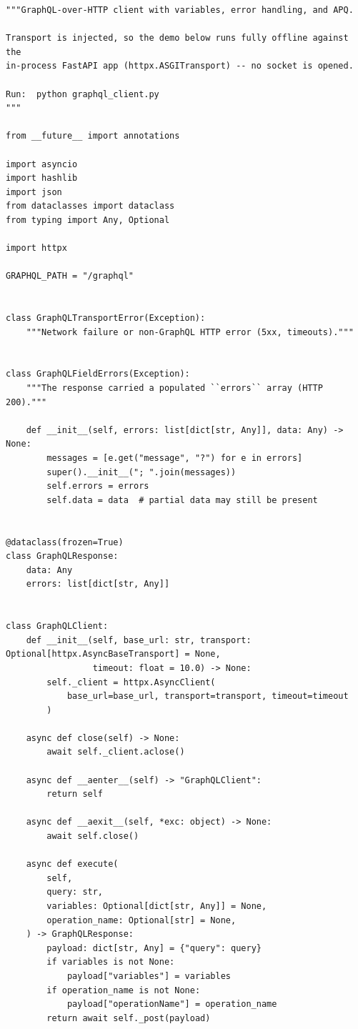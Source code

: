 \begin{verbatim}
"""GraphQL-over-HTTP client with variables, error handling, and APQ.

Transport is injected, so the demo below runs fully offline against the
in-process FastAPI app (httpx.ASGITransport) -- no socket is opened.

Run:  python graphql_client.py
"""

from __future__ import annotations

import asyncio
import hashlib
import json
from dataclasses import dataclass
from typing import Any, Optional

import httpx

GRAPHQL_PATH = "/graphql"


class GraphQLTransportError(Exception):
    """Network failure or non-GraphQL HTTP error (5xx, timeouts)."""


class GraphQLFieldErrors(Exception):
    """The response carried a populated ``errors`` array (HTTP 200)."""

    def __init__(self, errors: list[dict[str, Any]], data: Any) -> None:
        messages = [e.get("message", "?") for e in errors]
        super().__init__("; ".join(messages))
        self.errors = errors
        self.data = data  # partial data may still be present


@dataclass(frozen=True)
class GraphQLResponse:
    data: Any
    errors: list[dict[str, Any]]


class GraphQLClient:
    def __init__(self, base_url: str, transport: Optional[httpx.AsyncBaseTransport] = None,
                 timeout: float = 10.0) -> None:
        self._client = httpx.AsyncClient(
            base_url=base_url, transport=transport, timeout=timeout
        )

    async def close(self) -> None:
        await self._client.aclose()

    async def __aenter__(self) -> "GraphQLClient":
        return self

    async def __aexit__(self, *exc: object) -> None:
        await self.close()

    async def execute(
        self,
        query: str,
        variables: Optional[dict[str, Any]] = None,
        operation_name: Optional[str] = None,
    ) -> GraphQLResponse:
        payload: dict[str, Any] = {"query": query}
        if variables is not None:
            payload["variables"] = variables
        if operation_name is not None:
            payload["operationName"] = operation_name
        return await self._post(payload)


\end{verbatim}
